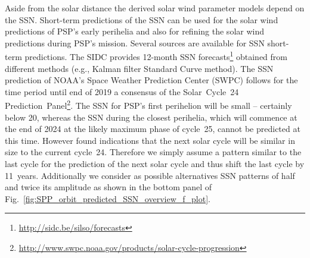 \documentclass[]{aa}
\begin{document}
	Aside from the solar distance the derived solar wind parameter models depend on the SSN. Short-term predictions of the SSN can be used for the solar wind predictions of PSP's early perihelia and also for refining the solar wind predictions during PSP's mission. Several sources are available for SSN short-term predictions. The SIDC provides 12-month SSN forecasts\footnote{\url{http://sidc.be/silso/forecasts}} obtained from different methods (e.g., Kalman filter Standard Curve method). The SSN prediction of NOAA's Space Weather Prediction Center (SWPC) follows for the time period until end of 2019 a consensus of the Solar~Cycle~24 Prediction~Panel\footnote{\url{http://www.swpc.noaa.gov/products/solar-cycle-progression}}.
	The SSN for PSP's first perihelion will be small -- certainly below 20, whereas the SSN during the closest perihelia, which will commence at the end of 2024 at the likely maximum phase of cycle~25, cannot be predicted at this time. However \citet{Hathaway2016} found indications that the next solar cycle will be similar in size to the current cycle~24. Therefore we simply assume a pattern similar to the last cycle for the prediction of the next solar cycle and thus shift the last cycle by 11~years. Additionally we consider as possible alternatives SSN patterns of half and twice its amplitude as shown in the bottom panel of Fig.~\ref{fig:SPP_orbit_predicted_SSN_overview_f_plot}.
\end{document}
